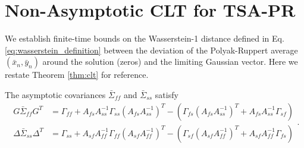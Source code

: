 \section{Non-Asymptotic CLT for TSA-PR}\label{sec:clt}
We establish finite-time bounds on the Wasserstein-1 distance defined in Eq. \eqref{eq:wasserstein_definition} between the deviation of the Polyak-Ruppert average $(\bar{x}_n, \bar{y}_n)$ around the solution (zeros) and the limiting Gaussian vector.
Here we restate Theorem \ref{thm:clt} for reference.
\begin{theorem}
    \CLT
\end{theorem}
The asymptotic covariances $\bar{\Sigma}_{ff}$ and $\bar{\Sigma}_{ss}$ satisfy
\begin{equation}
    \begin{split}
        G \bar{\Sigma}_{ff} G^T
        &= \Gamma_{ff} + A_{fs} A_{ss}^{-1} \Gamma_{ss} (A_{fs} A_{ss}^{-1})^T 
        - \left(\Gamma_{fs} (A_{fs} A_{ss}^{-1})^T + A_{fs} A_{ss}^{-1} \Gamma_{sf}\right)  \\
        \Delta \bar{\Sigma}_{ss} \Delta^T
        &= \Gamma_{ss} + A_{sf} A_{ff}^{-1} \Gamma_{ff} (A_{sf} A_{ff}^{-1})^T
        - \left(\Gamma_{sf} (A_{sf} A_{ff}^{-1})^T + A_{sf} A_{ff}^{-1} \Gamma_{fs}\right)         
    \end{split} . \label{eq:ttsapr_covariance}
\end{equation}


